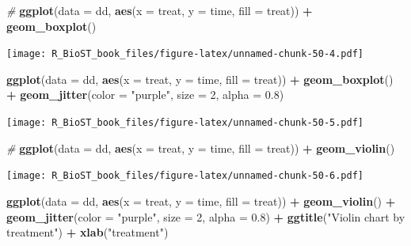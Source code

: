 \documentclass[
]{book}
\newenvironment{Shaded}{\begin{snugshade}}{\end{snugshade}}
\newcommand{\CommentTok}[1]{\textcolor[rgb]{0.56,0.35,0.01}{\textit{#1}}}
\newcommand{\DataTypeTok}[1]{\textcolor[rgb]{0.13,0.29,0.53}{#1}}
\newcommand{\DecValTok}[1]{\textcolor[rgb]{0.00,0.00,0.81}{#1}}
\newcommand{\FloatTok}[1]{\textcolor[rgb]{0.00,0.00,0.81}{#1}}
\newcommand{\KeywordTok}[1]{\textcolor[rgb]{0.13,0.29,0.53}{\textbf{#1}}}
\newcommand{\NormalTok}[1]{#1}
\newcommand{\OperatorTok}[1]{\textcolor[rgb]{0.81,0.36,0.00}{\textbf{#1}}}
\newcommand{\StringTok}[1]{\textcolor[rgb]{0.31,0.60,0.02}{#1}}
\begin{document}
\begin{Shaded}
\begin{Highlighting}[]
\CommentTok{\#}
\KeywordTok{ggplot}\NormalTok{(}\DataTypeTok{data =}\NormalTok{ dd, }\KeywordTok{aes}\NormalTok{(}\DataTypeTok{x =}\NormalTok{ treat, }\DataTypeTok{y =}\NormalTok{ time, }\DataTypeTok{fill =}\NormalTok{ treat)) }\OperatorTok{+}
\StringTok{    }\KeywordTok{geom\_boxplot}\NormalTok{()}
\end{Highlighting}
\end{Shaded}

\texttt{[image: R\_BioST\_book\_files/figure-latex/unnamed-chunk-50-4.pdf]}

\begin{Shaded}
\begin{Highlighting}[]
\KeywordTok{ggplot}\NormalTok{(}\DataTypeTok{data =}\NormalTok{ dd, }\KeywordTok{aes}\NormalTok{(}\DataTypeTok{x =}\NormalTok{ treat, }\DataTypeTok{y =}\NormalTok{ time, }\DataTypeTok{fill =}\NormalTok{ treat)) }\OperatorTok{+}
\StringTok{    }\KeywordTok{geom\_boxplot}\NormalTok{() }\OperatorTok{+}
\StringTok{    }\KeywordTok{geom\_jitter}\NormalTok{(}\DataTypeTok{color =} \StringTok{"purple"}\NormalTok{, }\DataTypeTok{size =} \DecValTok{2}\NormalTok{, }\DataTypeTok{alpha =} \FloatTok{0.8}\NormalTok{)}
\end{Highlighting}
\end{Shaded}

\texttt{[image: R\_BioST\_book\_files/figure-latex/unnamed-chunk-50-5.pdf]}

\begin{Shaded}
\begin{Highlighting}[]
\CommentTok{\#}
\KeywordTok{ggplot}\NormalTok{(}\DataTypeTok{data =}\NormalTok{ dd, }\KeywordTok{aes}\NormalTok{(}\DataTypeTok{x =}\NormalTok{ treat, }\DataTypeTok{y =}\NormalTok{ time, }\DataTypeTok{fill =}\NormalTok{ treat)) }\OperatorTok{+}
\StringTok{    }\KeywordTok{geom\_violin}\NormalTok{()}
\end{Highlighting}
\end{Shaded}

\texttt{[image: R\_BioST\_book\_files/figure-latex/unnamed-chunk-50-6.pdf]}

\begin{Shaded}
\begin{Highlighting}[]
\KeywordTok{ggplot}\NormalTok{(}\DataTypeTok{data =}\NormalTok{ dd, }\KeywordTok{aes}\NormalTok{(}\DataTypeTok{x =}\NormalTok{ treat, }\DataTypeTok{y =}\NormalTok{ time, }\DataTypeTok{fill =}\NormalTok{ treat)) }\OperatorTok{+}
\StringTok{    }\KeywordTok{geom\_violin}\NormalTok{() }\OperatorTok{+}
\StringTok{    }\KeywordTok{geom\_jitter}\NormalTok{(}\DataTypeTok{color =} \StringTok{"purple"}\NormalTok{, }\DataTypeTok{size =} \DecValTok{2}\NormalTok{, }\DataTypeTok{alpha =} \FloatTok{0.8}\NormalTok{) }\OperatorTok{+}\StringTok{ }
\StringTok{  }\KeywordTok{ggtitle}\NormalTok{(}\StringTok{"Violin chart by treatment"}\NormalTok{) }\OperatorTok{+}
\StringTok{    }\KeywordTok{xlab}\NormalTok{(}\StringTok{"treatment"}\NormalTok{)}
\end{Highlighting}
\end{Shaded}
\end{document}

